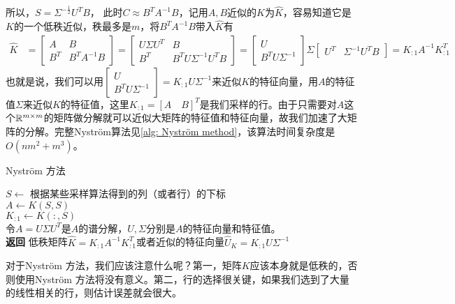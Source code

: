 所以，$S = \Sigma^{-\frac{1}{2}}U^T B$，
此时$C \approx B^T A^{-1} B$，记用$A,B$近似的$K$为$\hat{K}$，容易知道它是$K$的一个低秩近似，秩最多是$m$，将$B^T A^{-1} B$带入$\hat{K}$有
\begin{align*}
    \hat{K} & = \begin{bmatrix}
            A & B \\
            B^T & B^T A^{-1} B
          \end{bmatrix} 
          = \begin{bmatrix}
              U\Sigma U^T & B \\
            B^T & B^T U \Sigma^{-1} U^T B
          \end{bmatrix}
          = \begin{bmatrix}
            U \\
            B^T U \Sigma^{-1}
          \end{bmatrix} \Sigma
          \begin{bmatrix}
            U^T & \Sigma^{-1}U^T B
          \end{bmatrix}
          = K_{:1}A^{-1}K_{:1}^T
\end{align*}
也就是说，我们可以用$\begin{bmatrix} U \\ B^T U \Sigma^{-1} \end{bmatrix} = K_{:1}U\Sigma^{-1}$来近似$K$的特征向量，用$A$的特征值$\Sigma$来近似$K$的特征值，这里$K_{:1} = [A \quad B]^T$是我们采样的行。由于只需要对$A$这个$\mathbb{R}^{m\times m}$的矩阵做分解就可以近似大矩阵的特征值和特征向量，故我们加速了大矩阵的分解。完整Nyström算法见\ref{alg: Nyström method}，该算法时间复杂度是$O(nm^2 + m^3)$。
\begin{algorithm}
    \caption{Nyström 方法}\label{alg: Nyström method}
    $S \gets$ 根据某些采样算法得到的列（或者行）的下标 \\
    $A \gets K(S,S)$ \\
    $K_{:1} \gets K(:,S)$ \\
    令$A = U\Sigma U^T$是$A$的谱分解，$U,\Sigma$分别是$A$的特征向量和特征值。\\
    \textbf{返回} 低秩矩阵$\hat{K} = K_{:1}A^{-1}K_{:1}^T$或者近似的特征向量$\hat{U}_K = K_{:1}U\Sigma^{-1}$
\end{algorithm} 
对于Nyström 方法，我们应该注意什么呢？第一，矩阵$K$应该本身就是低秩的，否则使用Nyström 方法将没有意义。第二，行的选择很关键，如果我们选到了大量的线性相关的行，则估计误差就会很大。
